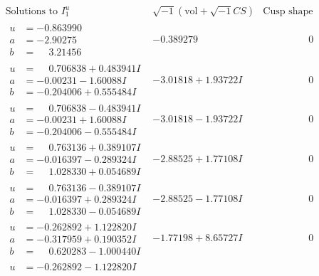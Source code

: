 \documentclass[1p]{elsarticle_modified}
\theoremstyle{definition}
\newcommand{\I}{\sqrt{-1}}
\begin{document}
$$\begin{array}{c|c|c}
\text{Solutions to }I^u_{1}& \I (\text{vol} + \sqrt{-1}CS) & \text{Cusp shape}\\
 \hline 
\begin{aligned}
u &= -0.863990\phantom{ +0.000000I} \\
a &= -2.90275\phantom{ +0.000000I} \\
b &= \phantom{-}3.21456\phantom{ +0.000000I}\end{aligned}
 & -0.389279\phantom{ +0.000000I} & \phantom{-0.000000 } 0 \\ \hline\begin{aligned}
u &= \phantom{-}0.706838 + 0.483941 I \\
a &= -0.00231 - 1.60088 I \\
b &= -0.204006 + 0.555484 I\end{aligned}
 & -3.01818 + 1.93722 I & \phantom{-0.000000 } 0 \\ \hline\begin{aligned}
u &= \phantom{-}0.706838 - 0.483941 I \\
a &= -0.00231 + 1.60088 I \\
b &= -0.204006 - 0.555484 I\end{aligned}
 & -3.01818 - 1.93722 I & \phantom{-0.000000 } 0 \\ \hline\begin{aligned}
u &= \phantom{-}0.763136 + 0.389107 I \\
a &= -0.016397 - 0.289324 I \\
b &= \phantom{-}1.028330 + 0.054689 I\end{aligned}
 & -2.88525 + 1.77108 I & \phantom{-0.000000 } 0 \\ \hline\begin{aligned}
u &= \phantom{-}0.763136 - 0.389107 I \\
a &= -0.016397 + 0.289324 I \\
b &= \phantom{-}1.028330 - 0.054689 I\end{aligned}
 & -2.88525 - 1.77108 I & \phantom{-0.000000 } 0 \\ \hline\begin{aligned}
u &= -0.262892 + 1.122820 I \\
a &= -0.317959 + 0.190352 I \\
b &= \phantom{-}0.620283 - 1.000440 I\end{aligned}
 & -1.77198 + 8.65727 I & \phantom{-0.000000 } 0 \\ \hline\begin{aligned}
u &= -0.262892 - 1.122820 I \\

\end{aligned}
\end{array}$$
\end{document}
